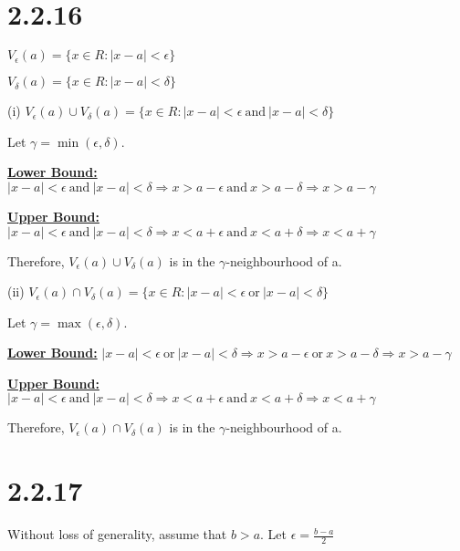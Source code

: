 \documentclass{article}
\begin{document}
\section*{2.2.16}

$V_{\epsilon}(a) = \{x \in R: |x-a| < \epsilon\}$

\noindent
$V_{\delta}(a) = \{x \in R: |x-a| < \delta\}$
\newline

\noindent
(i) $V_{\epsilon}(a) \cup V_{\delta}(a) = \{x \in R: |x-a| < \epsilon \ \text{and} \ |x-a| < \delta\}$
\newline

\noindent
Let $\gamma = \min(\epsilon, \delta)$.
\newline

\noindent
\textbf{\underline{Lower Bound:}}
$|x-a| < \epsilon \ \text{and} \ |x-a| < \delta \Rightarrow x > a-\epsilon \ \text{and} \ x > a-\delta \Rightarrow x > a-\gamma$
\newline

\noindent
\textbf{\underline{Upper Bound:}}
$|x-a| < \epsilon \ \text{and} \ |x-a| < \delta \Rightarrow x < a+\epsilon \ \text{and} \ x < a+\delta \Rightarrow x < a+\gamma$
\newline

\noindent
Therefore, $V_{\epsilon}(a) \cup V_{\delta}(a)$ is in the $\gamma$-neighbourhood of a.
\newline

\noindent
(ii) $V_{\epsilon}(a) \cap V_{\delta}(a) = \{x \in R: |x-a| < \epsilon \ \text{or} \ |x-a| < \delta\}$
\newline

\noindent
Let $\gamma = \max(\epsilon, \delta)$.
\newline

\noindent
\textbf{\underline{Lower Bound:}}
$|x-a| < \epsilon \ \text{or} \ |x-a| < \delta \Rightarrow x > a-\epsilon \ \text{or} \ x > a-\delta \Rightarrow x > a-\gamma$
\newline

\noindent
\textbf{\underline{Upper Bound:}}
$|x-a| < \epsilon \ \text{and} \ |x-a| < \delta \Rightarrow x < a+\epsilon \ \text{and} \ x < a+\delta \Rightarrow x < a+\gamma$
\newline

\noindent
Therefore, $V_{\epsilon}(a) \cap V_{\delta}(a)$ is in the $\gamma$-neighbourhood of a.
\newline

\section*{2.2.17}
Without loss of generality, assume that $b>a$. Let $\epsilon=\frac{b-a}{2}$
\newline
\end{document}
